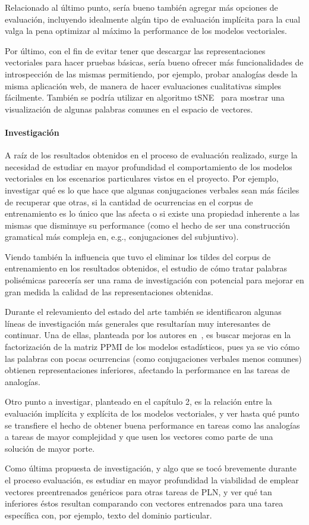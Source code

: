 Relacionado al último punto, sería bueno también agregar más opciones de evaluación, incluyendo
idealmente algún tipo de evaluación implícita para la cual valga la pena optimizar al máximo la
performance de los modelos vectoriales.

Por último, con el fin de evitar tener que descargar las representaciones vectoriales para hacer
pruebas básicas, sería bueno ofrecer más funcionalidades de introspección de las mismas permitiendo,
por ejemplo, probar analogías desde la misma aplicación web, de manera de hacer evaluaciones
cualitativas simples fácilmente. También se podría utilizar en algoritmo tSNE~\cite{tSNE} para
mostrar una visualización de algunas palabras comunes en el espacio de vectores.


\paragraph{Investigación}

A raíz de los resultados obtenidos en el proceso de evaluación realizado, surge la necesidad de
estudiar en mayor profundidad el comportamiento de los modelos vectoriales en los escenarios
particulares vistos en el proyecto. Por ejemplo, investigar qué es lo que hace que algunas
conjugaciones verbales sean más fáciles de recuperar que otras, si la cantidad de ocurrencias en el
corpus de entrenamiento es lo único que las afecta o si existe una propiedad inherente a las mismas
que disminuye su performance (como el hecho de ser una construcción gramatical más compleja en,
e.g., conjugaciones del subjuntivo).

Viendo también la influencia que tuvo el eliminar los tildes del corpus de entrenamiento en los
resultados obtenidos, el estudio de cómo tratar palabras polisémicas parecería ser una rama de
investigación con potencial para mejorar en gran medida la calidad de las representaciones
obtenidas.


Durante el relevamiento del estado del arte también se identificaron algunas líneas de investigación
más generales que resultarían muy interesantes de continuar. Una de ellas, planteada por los autores
en~\cite{Levy2014a}, es buscar mejoras en la factorización de la matriz PPMI de los modelos
estadísticos, pues ya se vio cómo las palabras con pocas ocurrencias (como conjugaciones verbales
menos comunes) obtienen representaciones inferiores, afectando la performance en las tareas de
analogías.

Otro punto a investigar, planteado en el capítulo 2, es la relación entre la evaluación implícita y
explícita de los modelos vectoriales, y ver hasta qué punto se transfiere el hecho de obtener buena
performance en tareas como las analogías a tareas de mayor complejidad y que usen los vectores como
parte de una solución de mayor porte.

Como última propuesta de investigación, y algo que se tocó brevemente durante el proceso evaluación,
es estudiar en mayor profundidad la viabilidad de emplear vectores preentrenados genéricos para
otras tareas de PLN, y ver qué tan inferiores éstos resultan comparando con vectores entrenados para
una tarea específica con, por ejemplo, texto del dominio particular.
